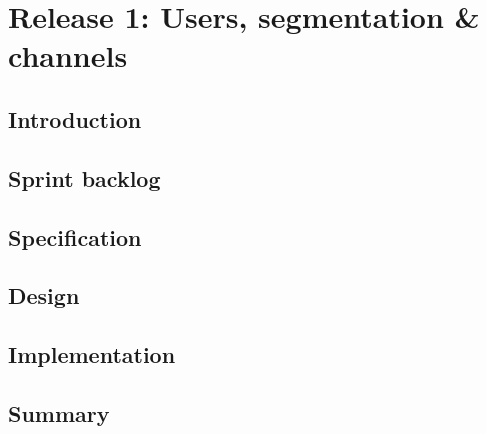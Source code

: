 \chapter{Release 1: Users, segmentation \& channels}

\section*{Introduction}


\section{Sprint backlog}
\section{Specification}
\section{Design}
\section{Implementation}

\section*{Summary}
